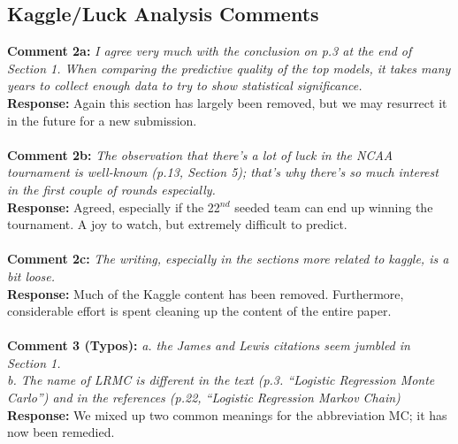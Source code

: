 \documentclass[11pt]{article} %
\begin{document}
\subsection*{Kaggle/Luck Analysis Comments}
{\bf Comment 2a:}  \emph{I agree very much with the conclusion on p.3 at the end of Section 1. When comparing the predictive quality of the top models, it takes many years to collect enough data to try to show statistical significance.} \\
{\bf Response:} Again this section has largely been removed, but we may resurrect it in the future for a new submission.\\
\\
{\bf Comment 2b:}  \emph{The observation that there's a lot of luck in the NCAA tournament is well-known (p.13, Section 5); that's why there's so much interest in the first couple of rounds especially.} \\
{\bf Response:} Agreed, especially if the 22$^{nd}$ seeded team can end up winning the tournament. A joy to watch, but extremely difficult to predict.\\
\\
{\bf Comment 2c:}  \emph{The writing, especially in the sections more related to kaggle, is a bit loose.} \\
{\bf Response:} Much of the Kaggle content has been removed. Furthermore, considerable effort is spent cleaning up the content of the entire paper.\\
\\
{\bf Comment 3 (Typos):}  \emph{a. the James and Lewis citations seem jumbled in Section 1. \\ b. The name of LRMC is different in the text (p.3. ``Logistic Regression Monte Carlo'') and in the references (p.22, ``Logistic Regression Markov Chain)} \\
{\bf Response:} We mixed up two common meanings for the abbreviation MC; it has now been remedied.\\
\\
\end{document}
